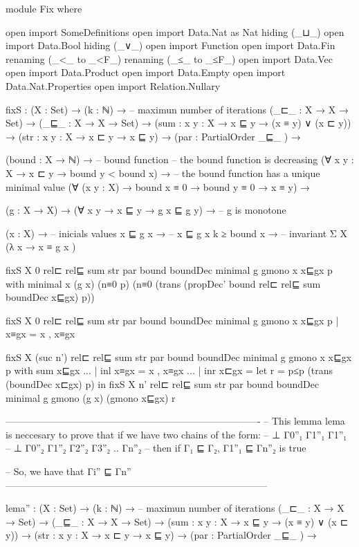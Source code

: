 module Fix where

open import SomeDefinitions
open import Data.Nat as Nat 
  hiding (_⊔_)
open import Data.Bool
   hiding (_∨_)
open import Function
open import Data.Fin
  renaming (_<_ to _<F_)
  renaming (_≤_ to _≤F_)
open import Data.Vec
open import Data.Product
open import Data.Empty 
open import Data.Nat.Properties
open import Relation.Nullary


fixS :  (X : Set) → 
       (k : ℕ) →               -- maximun number of iterations
       (_⊏_ : X → X → Set) → 
       (_⊑_ : X → X → Set) →
       (sum : {x y : X} → x ⊑ y → (x ≡ y) ∨ (x ⊏ y)) →   
       (str : {x y : X} → x ⊏ y → x ⊑ y) →
       (par : PartialOrder _⊑_ ) →

       (bound : X → ℕ) →                     -- bound function 
       -- the bound function is decreasing 
       (∀ {x y : X} → x ⊏ y → bound y < bound x) →  
       -- the bound function has a unique minimal value
       (∀ (x y : X) → bound x ≡ 0 → bound y ≡ 0 → x ≡ y) → 

       (g : X → X) → 
       (∀ {x y} → x ⊑ y → g x ⊑ g y) → -- g is monotone

       (x : X) →                 -- inicials values   
       x ⊑ g x →                    -- x ⊑ g x 
       k ≥ bound x →              -- invariant
       Σ X (λ x → x ≡ g x ) 

fixS X 0 rel⊏ rel⊑ sum str par bound boundDec minimal g gmono x x⊑gx p 
   with minimal x (g x) (n≡0 p)
        (n≡0 (trans (propDec' bound rel⊏ rel⊑ sum boundDec x⊑gx) p))
        
fixS X 0 rel⊏ rel⊑ sum str par bound boundDec minimal g gmono x x⊑gx p |  x≡gx = x , x≡gx 


fixS X (suc n') rel⊏ rel⊑ sum str par bound boundDec minimal g gmono
    x x⊑gx p with sum x⊑gx
... | inl x≡gx = x , x≡gx 
... | inr x⊏gx = let r = p≤p (trans (boundDec x⊏gx) p)
                  in fixS X n' rel⊏ rel⊑ sum str par bound boundDec minimal g
                       gmono (g x) (gmono x⊑gx) r 


-------------------------------------------------------------------------------
-- This lemma lema is neccesary to prove that if we have two chains of the form: 
-- ⊥ Γ0''₁ Γ1''₁ Γ1''₁ 
-- ⊥ Γ0''₂ Γ1''₂ Γ2''₂ Γ3''₂ .. Γn''₂ 
-- then if Γ₁ ⊑ Γ₂,  Γ1''₁ ⊑ Γn''₂ is true

-- So, we have that Γi'' ⊑ Γn''
---------------------------------------------------------------------------------

lema'' :  (X : Set) → 
       (k : ℕ) →               -- maximun number of iterations
       (_⊏_ : X → X → Set) →
       (_⊑_ : X → X → Set) → 
       (sum : {x y : X} → x ⊑ y → (x ≡ y) ∨ (x ⊏ y)) →   
       (str : {x y : X} → x ⊏ y → x ⊑ y) →
       (par : PartialOrder _⊑_ ) → 
       
